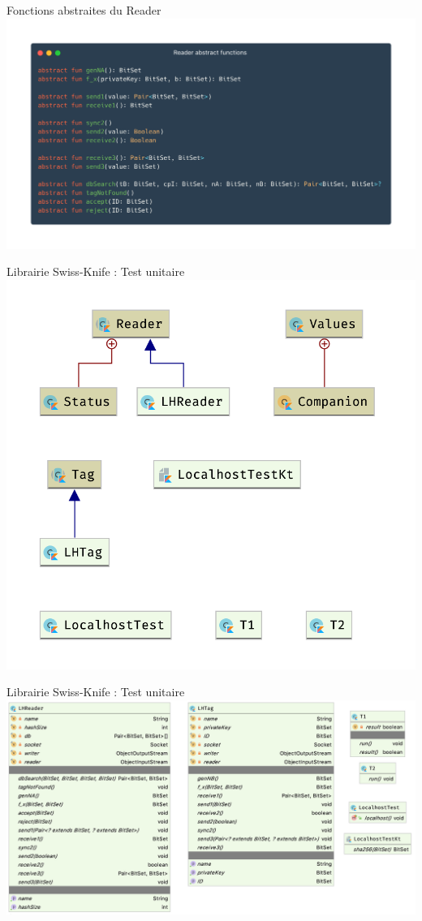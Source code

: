 \documentclass[aspectratio=169]{beamer}
\begin{document}
\begin{frame}{Fonctions abstraites du Reader}
  \centering
  \includegraphics[width=.95\linewidth]{../assets/readerAbs}
\end{frame}

\begin{frame}{Librairie Swiss-Knife : Test unitaire}
  \centering
  \includegraphics[width=.65\linewidth]{../assets/uml_test}
\end{frame}

\begin{frame}{Librairie Swiss-Knife : Test unitaire}
  \centering
  \includegraphics[width=.9\linewidth]{../assets/uml_test_detail}
\end{frame}
\end{document}
